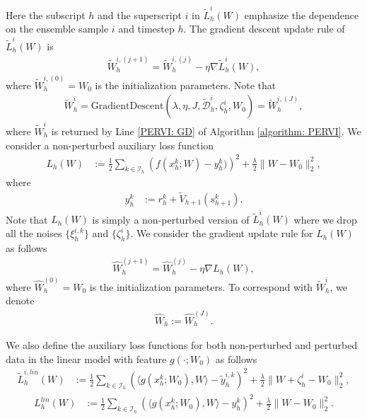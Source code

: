 \documentclass{article} \usepackage{iclr2023/iclr2023_conference,times}
\begin{document}
Here the subscript $h$ and the superscript $i$ in $\tilde{L}_h^i(W)$ emphasize the dependence on the ensemble sample $i$ and timestep $h$. The gradient descent update rule of $\tilde{L}^i_h(W)$ is
\begin{align}
    \tilde{W}^{i,(j+1)}_h = \tilde{W}^{i,(j)}_h - \eta \nabla \tilde{L}^i_h(W),
    \label{eq: GD update in non-linear case}
\end{align}
where $\tilde{W}^{i,(0)}_h = W_0$ is the initialization parameters. Note that 
\begin{align*}
    \tilde{W}^i_h = \textrm{GradientDescent}(\lambda, \eta, J, \tilde{\mathcal{D}}^i_h, \zeta^i_h, W_0) = \tilde{W}^{i,(J)}_h,
\end{align*}
where $\tilde{W}^i_h$ is returned by Line \ref{PERVI: GD} of Algorithm \ref{algorithm: PERVI}. We consider a non-perturbed auxiliary loss function 
\begin{align}
    L_h(W) &:= \frac{1}{2} \sum_{k \in \mathcal{I}_h} \left( f(x^k_h; W) - y^k_h ) \right)^2 + \frac{\lambda}{2} \| W - W_0  \|_2^2,
    \label{eq: non=perturbed loss function}
\end{align}
where 
\begin{align*}
y^k_h &:= r^k_h + \tilde{V}_{h+1}(s^k_{h+1}). 
\end{align*}
Note that $L_h(W)$ is simply a non-perturbed version of $\tilde{L}_h^i(W)$ where we drop all the noises $ \{\xi^{i,k}_h \}$ and $ \{ \zeta^i_h \}$. We consider the gradient update rule for $L_h(W)$ as follows
\begin{align}
    \hat{W}^{(j+1)}_h = \hat{W}^{(j)}_h - \eta \nabla L_h(W),
    \label{eq: GD update in non-linear case for non-perturbed loss}
\end{align}
where $\hat{W}^{(0)}_h = W_0$ is the initialization parameters. To correspond with $\tilde{W}^i_h$, we denote 
\begin{align}
    \hat{W}_h := \hat{W}_h^{(J)}. 
    \label{eq: hat W_h}
\end{align}

We also define the auxiliary loss functions for both non-perturbed and perturbed data in the linear model with feature $g(\cdot; W_0)$ as follows
\begin{align}
    \tilde{L}_h^{i, lin}(W) &:= \frac{1}{2} \sum_{k \in \mathcal{I}_h} \left( \langle g(x^k_h; W_0), W  \rangle -  \tilde{y}^{i,k}_h \right)^2 + \frac{\lambda}{2} \| W + \zeta^i_h - W_0 \|_2^2,
\end{align}
\begin{align}
    L_h^{lin}(W) &:= \frac{1}{2}\sum_{k \in \mathcal{I}_h} \left( \langle g(x^k_h; W_0), W  \rangle - y^k_h \right)^2 + \frac{\lambda}{2} \| W - W_0  \|_2^2. 
\end{align}
\end{document}
